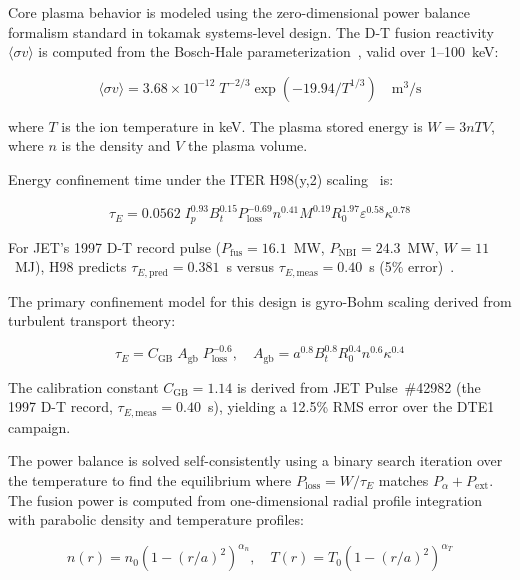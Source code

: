 \documentclass[11pt,a4paper]{article}
\begin{document}
Core plasma behavior is modeled using the zero-dimensional power balance formalism standard in tokamak systems-level design. The D-T fusion reactivity $\langle \sigma v \rangle$ is computed from the Bosch-Hale parameterization~\cite{bosch1992}, valid over 1--100~keV:

\begin{equation}
\langle \sigma v \rangle = 3.68 \times 10^{-12} \; T^{-2/3}
\exp(-19.94 / T^{1/3}) \quad \text{m}^3/\text{s}
\label{eq:reactivity}
\end{equation}

where $T$ is the ion temperature in keV. The plasma stored energy is $W = 3 n T V$, where $n$ is the density and $V$ the plasma volume.

Energy confinement time under the ITER H98(y,2) scaling~\cite{iter1999} is:

\begin{equation}
\tau_E = 0.0562 \; I_p^{0.93} B_t^{0.15} P_{\text{loss}}^{-0.69}
n^{0.41} M^{0.19} R_0^{1.97} \varepsilon^{0.58} \kappa^{0.78}
\label{eq:h98}
\end{equation}

For JET's 1997 D-T record pulse ($P_{\text{fus}} = 16.1$~MW, $P_{\text{NBI}} = 24.3$~MW, $W = 11$~MJ), H98 predicts $\tau_{E,\text{pred}} = 0.381$~s versus $\tau_{E,\text{meas}} = 0.40$~s (5\% error)~\cite{keilhacker1999}.

The primary confinement model for this design is gyro-Bohm scaling derived from turbulent transport theory:

\begin{equation}
\tau_E = C_{\text{GB}} \; A_{\text{gb}} \; P_{\text{loss}}^{-0.6}, \quad
A_{\text{gb}} = a^{0.8} B_t^{0.8} R_0^{0.4} n^{0.6} \kappa^{0.4}
\label{eq:gb}
\end{equation}

The calibration constant $C_{\text{GB}} = 1.14$ is derived from JET Pulse~\#42982 (the 1997 D-T record, $\tau_{E,\text{meas}} = 0.40$~s), yielding a 12.5\% RMS error over the DTE1 campaign.

The power balance is solved self-consistently using a binary search iteration over the temperature to find the equilibrium where $P_{\text{loss}} = W / \tau_E$ matches $P_\alpha + P_{\text{ext}}$. The fusion power is computed from one-dimensional radial profile integration with parabolic density and temperature profiles:

\begin{equation}
n(r) = n_0 \left(1 - (r/a)^2\right)^{\alpha_n}, \quad
T(r) = T_0 \left(1 - (r/a)^2\right)^{\alpha_T}
\label{eq:profiles}
\end{equation}
\end{document}
